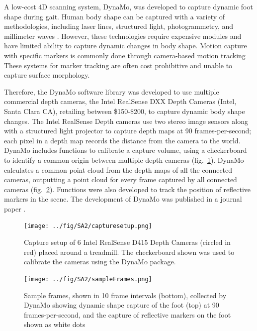 \documentclass[defaultstyle,11pt]{comps}
\begin{document}
A low-cost 4D scanning system, DynaMo, was developed to capture dynamic foot shape during gait.
Human body shape can be captured with a variety of methodologies, including laser lines, structured light, photogrammetry, and millimeter waves \citep{Daanen2013}.
However, these technologies require expensive modules and have limited ability to capture dynamic changes in body shape.
Motion capture with specific markers is commonly done through camera-based motion tracking \citep{Windolf2008}
These systems for marker tracking are often cost prohibitive and unable to capture surface morphology.

Therefore, the DynaMo software library was developed to use multiple commercial depth cameras, the Intel RealSense DXX Depth Cameras (Intel, Santa Clara CA), retailing between \$150-\$200, to capture dynamic body shape changes.
The Intel RealSense Depth cameras use two stereo image sensors along with a structured light projector to capture depth maps at 90 frames-per-second; each pixel in a depth map records the distance from the camera to the world.
DynaMo includes functions to calibrate a capture volume, using a checkerboard to identify a common origin between multiple depth cameras (fig.~\ref{fig:testSetup}).
DynaMo calculates a common point cloud from the depth maps of all the connected cameras, outputting a point cloud for every frame captured by all connected cameras (fig.~\ref{fig:SA2-sampleFrames}).
Functions were also developed to track the position of reflective markers in the scene.
The development of DynaMo was published in a journal paper \citep{Boppana2019}.

\begin{figure}
\hypertarget{fig:testSetup}{%
\centering
\texttt{[image: ../fig/SA2/capturesetup.png]}
\caption{Capture setup of 6 Intel RealSense D415 Depth Cameras (circled in red) placed around a treadmill. The checkerboard shown was used to calibrate the cameras using the DynaMo package.}\label{fig:testSetup}
}
\end{figure}

\begin{figure}
\hypertarget{fig:SA2-sampleFrames}{%
\centering
\texttt{[image: ../fig/SA2/sampleFrames.png]}
\caption{Sample frames, shown in 10 frame intervals (bottom), collected by DynaMo showing dynamic shape capture of the foot (top) at 90 frames-per-second, and the capture of reflective markers on the foot shown as white dots}\label{fig:SA2-sampleFrames}
}
\end{figure}
\end{document}
